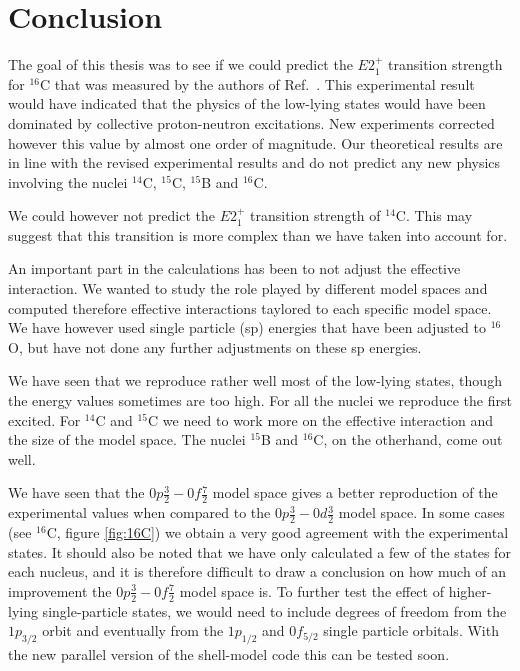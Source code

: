 \chapter{Conclusion}

The goal of this thesis was to see if we could predict the $E2_1^+$ transition
strength for  $^{16}$C that was measured by the authors of Ref.~\citep{16CLifetime}. 
This experimental result would have indicated that the physics of the low-lying states
would have been dominated by collective proton-neutron excitations. New experiments corrected however this value
by almost one order of magnitude. 
Our theoretical results are in line with the revised experimental results and do not predict any new
physics involving the nuclei $^{14}$C, $^{15}$C, $^{15}$B and $^{16}$C.

We could however not predict the $E2_1^+$ transition strength of $^{14}$C. This
may suggest that this transition is more complex than we have taken into account
for.

An important part in the calculations has been to 
not adjust the effective interaction. 
We wanted to study the role played by different model spaces and computed therefore effective interactions
taylored to each specific model space.   
We have however used single particle
(sp) energies that have been adjusted to $^{16}$O, but have not done any
further adjustments on these sp energies. 

We have seen that we reproduce  rather well most of the low-lying states,
though the energy values sometimes are too high. For all the nuclei we reproduce 
the first excited. For $^{14}$C and $^{15}$C we need to work more on
the effective interaction and the size of the model space. 
The nuclei $^{15}$B and $^{16}$C, on the otherhand, come out
well.

We have seen that the $0p\frac32-0f\frac72$ model space gives a better reproduction of the 
experimental values when compared to the $0p\frac32-0d\frac32$ model space. In some
cases (see $^{16}$C, figure \ref{fig:16C}) we obtain a very good agreement with  the
experimental states. It should also be noted that we have only
calculated a few of the states for each nucleus, and it is therefore difficult
to draw a conclusion on how much of an improvement the $0p\frac32-0f\frac72$
model space is.  To further test the effect of higher-lying single-particle states,
we would need to include degrees of freedom from the $1p_{3/2}$ orbit and eventually from
the  $1p_{1/2}$ and $0f_{5/2}$ single particle orbitals. 
With the new parallel version of the shell-model code this can be tested
soon.

